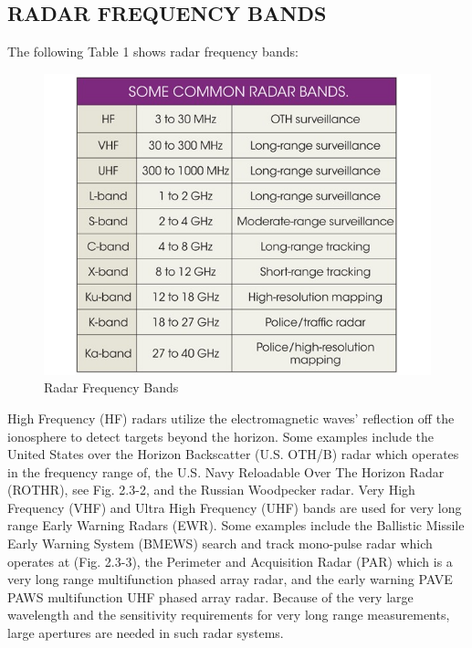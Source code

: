 \documentclass[14pt]{article} %
\begin{document}
\subsection{RADAR FREQUENCY BANDS}
The following Table 1 shows radar frequency bands:

\begin{figure}[H]
 \centerline{\includegraphics[width=0.75\linewidth]{band.jpg}}
  \caption{Radar Frequency Bands}
  \label{fig:figure 3}
\end{figure}
 

High Frequency (HF) radars utilize the electromagnetic waves’ reflection off the ionosphere to detect targets beyond the horizon. Some examples include the United States over the Horizon Backscatter (U.S. OTH/B) radar which operates in the frequency range of, the U.S. Navy Reloadable Over The Horizon Radar (ROTHR), see Fig. 2.3-2, and the Russian Woodpecker radar. Very High Frequency (VHF) and Ultra High Frequency (UHF) bands are used for very long range Early Warning Radars (EWR). Some examples include the Ballistic Missile Early Warning System (BMEWS) search and track mono-pulse radar which operates at (Fig. 2.3-3), the Perimeter and Acquisition Radar (PAR) which is a very long range multifunction phased
array radar, and the early warning PAVE PAWS multifunction UHF phased array radar. Because of the very large wavelength and the sensitivity requirements for very long range measurements, large apertures are needed in such radar systems.
\end{document}
